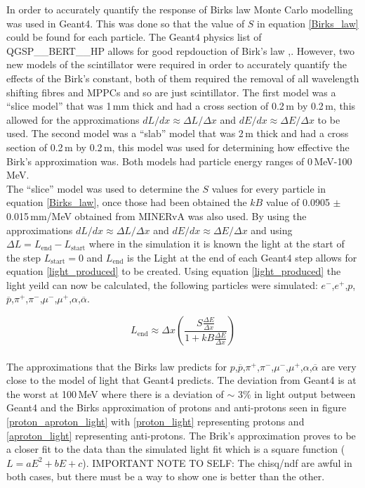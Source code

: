 \documentclass[12pt,a4paper]{article}
\begin{document}
In order to accurately quantify the response of Birks law Monte Carlo modelling was used in Geant4. This was done so that the value of $S$ in equation \ref{Birks_law} could be found for each particle. The Geant4 physics list of QGSP\_\_BERT\_\_HP allows for good repdouction of Birk's law \cite{Minerva_QGSP},\cite{minerva_birks}. However, two new models of the scintillator were required in order to accurately quantify the effects of the Birk's constant, both of them required the removal of all wavelength shifting fibres and MPPCs and so are just scintillator. The first model was a ``slice model'' that was 1\,mm thick and had a cross section of 0.2\,m by 0.2\,m, this allowed for the approximations $dL/dx \approx \Delta L / \Delta x$ and $dE/dx \approx \Delta E / \Delta x$ to be used. The second model was a ``slab'' model that was 2\,m thick and had a cross section of 0.2\,m by 0.2\,m, this model was used for determining how effective the Birk's approximation was. Both models had particle energy ranges of 0\,MeV-100\,MeV.\\

The ``slice'' model was used to determine the $S$ values for every particle in equation \ref{Birks_law}, once those had been obtained the $kB$ value of 0.0905 $\pm$ 0.015\,mm/MeV obtained from MINERvA was also used. By using the approximations $dL/dx \approx \Delta L / \Delta x$ and $dE/dx \approx \Delta E / \Delta x$ and using $\Delta L = L_{\textrm{end}} - L_{\textrm{start}} $ where in the simulation it is known the light at the start of the step $L_{\textrm{start}} = 0$ and $L_{\textrm{end}}$ is the Light at the end of each Geant4 step allows for equation \ref{light_produced} to be created. Using equation \ref{light_produced} the light yeild can now be calculated, the following particles were simulated: $e^-$,$e^+$,$p$,$\overline{p}$,$\pi^+$,$\pi^-$,$\mu^-$,$\mu^+$,$\alpha$,$\overline{\alpha}$. 

\begin{equation}
L_{\textrm{end}}\approx \Delta x \left(\frac{S\frac{\Delta E}{\Delta x}}{1 + kB \frac{\Delta E}{\Delta x}}\right) 
\label{light_produced}
\end{equation}\\

The approximations that the Birks law predicts for $p$,$\overline{p}$,$\pi^+$,$\pi^-$,$\mu^-$,$\mu^+$,$\alpha$,$\overline{\alpha}$ are very close to the model of light that Geant4 predicts. The deviation from Geant4 is at the worst at 100\,MeV where there is a deviation of $\sim$ $3\%$ in light output between Geant4 and the Birks approximation of protons and anti-protons seen in figure \ref{proton_aproton_light} with \ref{proton_light} representing protons and \ref{aproton_light} representing anti-protons. The Brik's approximation proves to be a closer fit to the data than the simulated light fit which is a square function ($L = aE^2 + bE+ c$). IMPORTANT NOTE TO SELF: The chisq/ndf are awful in both cases, but there must be a way to show one is better than the other.
\end{document}
